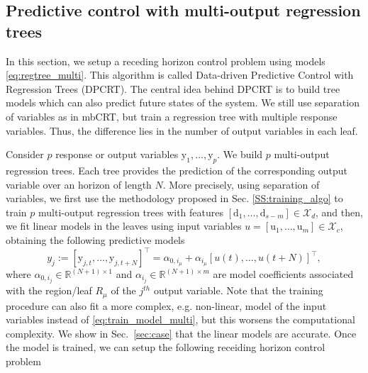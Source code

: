 \subsection{Predictive control with multi-output regression trees}
\label{SS:control_tree}
In this section, we setup a receding horizon control problem using models \eqref{eq:regtree_multi}. 
This algorithm is called Data-driven Predictive Control with Regression Trees (DPCRT). The central idea behind DPCRT is to build tree models which can also predict future states of the system. 
We still use separation of variables as in mbCRT, but train a regression tree with multiple response variables. 
Thus, the difference lies in the number of output variables in each leaf.

Consider $p$ response or output variables $\mathrm{y}_1,\ldots,\mathrm{y}_p$. 
We build $p$ multi-output regression trees. 
Each tree provides the prediction of the corresponding output variable over an horizon of length $N$. 
More precisely, using separation of variables, we first use the methodology proposed in Sec. \ref{SS:training_algo} to train $p$ multi-output regression trees with features $[\mathrm{d}_1,\ldots,\mathrm{d}_{s-m}]\in\mathcal{X}_d$, and then, we fit linear models in the leaves using input variables $u=[\mathrm{u}_1,\ldots,\mathrm{u}_{m}]\in\mathcal{X}_c$, obtaining the following predictive models
\begin{equation}\label{eq:train_model_multi}
y_j := [\mathrm{y}_{j,t}, \ldots, \mathrm{y}_{j,t+N}]^\top = \alpha_{0,i_\mu} + \alpha_{i_\mu} [u(t),\ldots,u(t+N)]^\top,
\end{equation}
where $\alpha_{0,i_j}\in\mathbb{R}^{(N+1)\times 1}$ and $\alpha_{i_j}\in\mathbb{R}^{(N+1)\times m}$ are model coefficients associated with the region/leaf $R_\mu$ of the $j^{th}$ output variable. 
Note that the training procedure can also fit a more complex, e.g. non-linear, model of the input variables instead of \eqref{eq:train_model_multi}, but this worsens the computational complexity. 
We show in Sec.~\ref{sec:case} that the linear models are accurate. 
Once the model is trained, we can setup the following receiding horizon control problem
